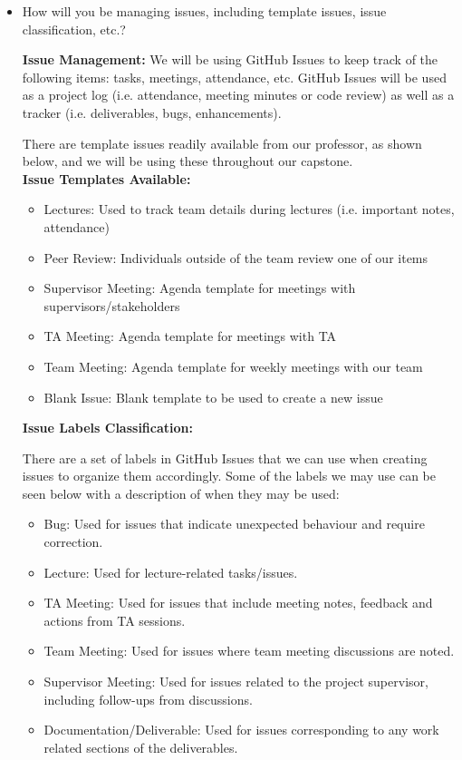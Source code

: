 \documentclass{article}
\begin{document}
\begin{itemize}
 \item How will you be managing issues, including template issues, issue
 classification, etc.?


\textbf{Issue Management:}
We will be using GitHub Issues to keep track of the following items: tasks, meetings, attendance, etc. GitHub Issues will be used as a project log (i.e. attendance, meeting minutes or code review) as well as a tracker (i.e. deliverables, bugs, enhancements).


There are template issues readily available from our professor, as shown below, and we will be using these throughout our capstone. \\


\textbf{Issue Templates Available:}

\begin{itemize}
  \item Lectures: Used to track team details during lectures (i.e. important notes, attendance)
  \item Peer Review: Individuals outside of the team review one of our items
  \item Supervisor Meeting: Agenda template for meetings with supervisors/stakeholders
  \item TA Meeting: Agenda template for meetings with TA
  \item Team Meeting: Agenda template for weekly meetings with our team
  \item Blank Issue: Blank template to be used to create a new issue \\
\end{itemize}

\textbf{Issue Labels Classification:}

There are a set of labels in GitHub Issues that we can use when creating issues to organize them accordingly. Some of the labels we may use can be seen below with a description of when they may be used:

\begin{itemize}
  \item Bug: Used for issues that indicate unexpected behaviour and require correction.
  \item Lecture: Used for lecture-related tasks/issues.
  \item TA Meeting: Used for issues that include meeting notes, feedback and actions from TA sessions.
  \item Team Meeting: Used for issues where team meeting discussions are noted.
  \item Supervisor Meeting: Used for issues related to the project supervisor, including follow-ups from discussions.
  \item Documentation/Deliverable: Used for issues corresponding to any work related sections of the deliverables.
\end{itemize}


\end{itemize}
\end{document}

